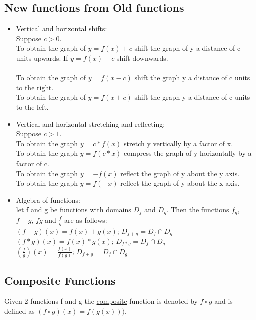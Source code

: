 \documentclass{article}
\begin{document}
	\subsection{New functions from Old functions}
	\begin{itemize}
		\item Vertical and horizontal shifts: \\
		Suppose $c>0$.\\ To obtain the graph of $y = f(x) + c$ shift the graph of y a distance of c units upwards. If $y = f(x)-c$ shift downwards. \\ \\
		To obtain the graph of $y=f(x-c)$ shift the graph y a distance of c units to the right. \\
		To obtain the graph of $y=f(x+c)$ shift the graph y a distance of c units to the left. \\
		\item Vertical and horizontal stretching and reflecting: \\
		Suppose $c>1$. \\
		To obtain the graph $y=c*f(x)$ stretch y vertically by a factor of x. \\
		To obtain the graph $y=f(c*x)$ compress the graph of y horizontally by a factor of c. \\
		To obtain the graph $y=-f(x)$ reflect the graph of y about the y axis. \\
		To obtain the graph $y=f(-x)$ reflect the graph of y about the x axis. \\
		\item Algebra of functions: \\
		let f and g be functions with domains $D_f$ and $D_g$. Then the functions $f_g$, $f-g$, $fg$ and $\frac{f}{g}$ are as follows: \\
		$(f\pm g)(x) = f(x)\pm g(x)$; $D_{f+g} = D_f \cap D_g$ \\ 
		$(f* g)(x) = f(x)*g(x)$; $D_{f*g} = D_f \cap D_g$\\
		$(\frac{f}{g})(x) = \frac{f(x)}{f(g)}$; $D_{f+g} = D_f \cap D_g$
	\end{itemize}
	\subsection{Composite Functions}
	Given 2 functions f and g the \underline{composite} function is denoted by $f \circ  g$ and is defined as $(f \circ g)(x) = f(g(x)))$.\\
	
\end{document}
